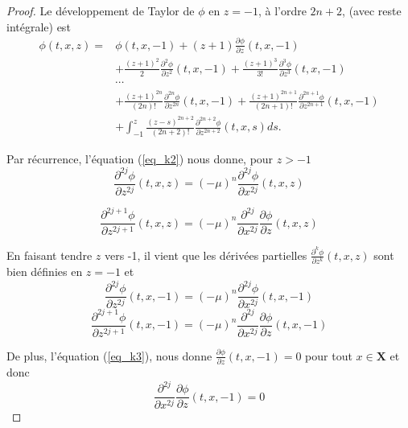 \documentclass[12pt,a4paper]{article}
\numberwithin{equation}{section}
\begin{document}
\begin{proof}
Le développement de Taylor de $\phi$ en $z = -1$, à l'ordre $2n+2$, (avec reste intégrale) est
\begin{equation*}
\begin{split}
    \phi(t,x,z) = &\phi(t,x,-1) + (z+1)\frac{\partial \phi}{\partial z}(t,x,-1)\\
    &+ \frac{(z+1)^2}{2}\frac{\partial^2 \phi}{\partial z^2}(t,x,-1) + \frac{(z+1)^3}{3!}\frac{\partial^3 \phi}{\partial z^3}(t,x,-1)\\
    & \cdots\\
    &+ \frac{(z+1)^{2n}}{(2n)!}\frac{\partial^{2n} \phi}{\partial z^{2n}}(t,x,-1) + \frac{(z+1)^{2n+1}}{(2n+1)!}\frac{\partial^{2n+1} \phi}{\partial z^{2n+1}}(t,x,-1)\\
    &+\int_{-1}^z\frac{(z-s)^{2n+2}}{(2n+2)!}\frac{\partial^{2n+2} \phi}{\partial z^{2n+2}}(t,x,s)ds.
\end{split}
\end{equation*}

Par récurrence, l'équation (\ref{eq_k2}) nous donne, pour $z>-1$
\begin{equation*}
    \frac{\partial^{2j} \phi}{\partial z^{2j}}(t,x,z) = (-\mu)^{n}\frac{\partial^{2j} \phi}{\partial x^{2j}}(t,x,z)
\end{equation*}

\begin{equation*}
    \frac{\partial^{2j+1} \phi}{\partial z^{2j+1}}(t,x,z) = (-\mu)^{n}\frac{\partial^{2j}}{\partial x^{2j}}\frac{\partial \phi}{\partial z}(t,x,z)
\end{equation*}

En faisant tendre $z$ vers -1, il vient que les dérivées partielles $\frac{\partial^{k} \phi}{\partial z^{k}}(t,x,z)$ sont bien définies en $z = -1$ et 
\begin{equation*}
    \frac{\partial^{2j} \phi}{\partial z^{2j}}(t,x,-1) = (-\mu)^{n}\frac{\partial^{2j} \phi}{\partial x^{2j}}(t,x,-1)
\end{equation*}
\begin{equation*}
    \frac{\partial^{2j+1} \phi}{\partial z^{2j+1}}(t,x,-1) = (-\mu)^{n}\frac{\partial^{2j}}{\partial x^{2j}}\frac{\partial \phi}{\partial z}(t,x,-1)
\end{equation*}

De plus, l'équation (\ref{eq_k3}), nous donne $\frac{\partial \phi}{\partial z}(t,x,-1) = 0$ pour tout $x\in \textbf{X}$ et donc 
\begin{equation*}
    \frac{\partial^{2j}}{\partial x^{2j}}\frac{\partial \phi}{\partial z}(t,x,-1) = 0
\end{equation*}


\end{proof}
\end{document}

